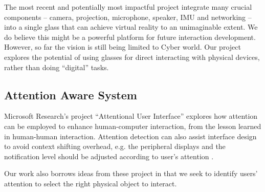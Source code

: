 The most recent and potentially most impactful project \cite{GoogleGlass} integrate many crucial components -- camera, projection, microphone, speaker, IMU and networking -- into a single glass that can achieve virtual reality to an unimaginable extent. We do believe this might be a powerful platform for future interaction development. However, so far the vision is still being limited to Cyber world. Our project explores the potential of using glasses for direct interacting with physical devices, rather than doing ``digital'' tasks.

\subsection{Attention Aware System}
\label{sec:attent-aware-syst}

Microsoft Research's project ``Attentional User Interface'' \cite{horvitz2003models} explores how attention can be employed to enhance human-computer interaction, from the lesson learned in human-human interaction. Attention detection can also assist interface design to avoid context shifting overhead, e.g. the peripheral displays and the notification level should be adjusted according to user's attention \cite{parkdesigning}.

Our work also borrows ideas from these project in that we seek to identify users' attention to select the right physical object to interact.

